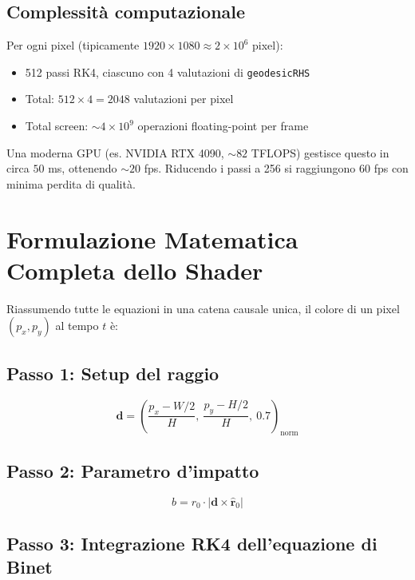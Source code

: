 \documentclass[12pt, a4paper, twoside]{article}
\theoremstyle{definition}
\begin{document}
\subsection{Complessità computazionale}

Per ogni pixel (tipicamente $1920 \times 1080 \approx 2 \times 10^6$ pixel):
\begin{itemize}
  \item 512 passi RK4, ciascuno con 4 valutazioni di \texttt{geodesicRHS}
  \item Total: $512 \times 4 = 2048$ valutazioni per pixel
  \item Total screen: $\sim 4 \times 10^9$ operazioni floating-point per frame
\end{itemize}

Una moderna GPU (es. NVIDIA RTX 4090, $\sim 82$ TFLOPS) gestisce questo in
circa $50$ ms, ottenendo $\sim 20$ fps. Riducendo i passi a 256 si raggiungono
60 fps con minima perdita di qualità.

\newpage

\section{Formulazione Matematica Completa dello Shader}

Riassumendo tutte le equazioni in una catena causale unica, il colore di un
pixel $(p_x, p_y)$ al tempo $t$ è:

\subsection*{Passo 1: Setup del raggio}

\begin{equation}
  \mathbf{d} = \left(\frac{p_x - W/2}{H},\ \frac{p_y - H/2}{H},\ 0.7\right)_{\!\text{norm}}
\end{equation}

\subsection*{Passo 2: Parametro d'impatto}

\begin{equation}
  b = r_0 \cdot |\mathbf{d} \times \hat{\mathbf{r}}_0|
\end{equation}

\subsection*{Passo 3: Integrazione RK4 dell'equazione di Binet}
\end{document}
